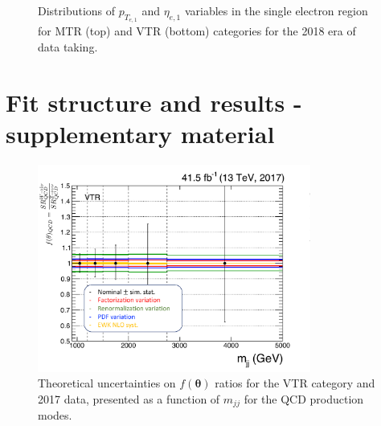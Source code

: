 \begin{figure}[htbp]
{    }
  \caption{Distributions of $p_{T_{e,1}}$ and $\eta_{e,1}$ variables in the single electron region for MTR (top) and VTR (bottom) categories for the 2018 era of data taking.}
  \label{app:2018_Wenu_1}
\end{figure}



\newpage

\section{Fit structure and results - supplementary material}



\begin{figure}[htbp]
  \centering
   \includegraphics[width= 0.8\textwidth]{FIt_structure/theory_uncert_VTR_2017.pdf}
    
  \caption{Theoretical uncertainties on $f(\boldsymbol{\theta})$ ratios for the VTR category and 2017 data, presented as a function of $m_{jj}$ for the QCD production modes.}
  \label{app:theory_VTR_2017}
\end{figure}



